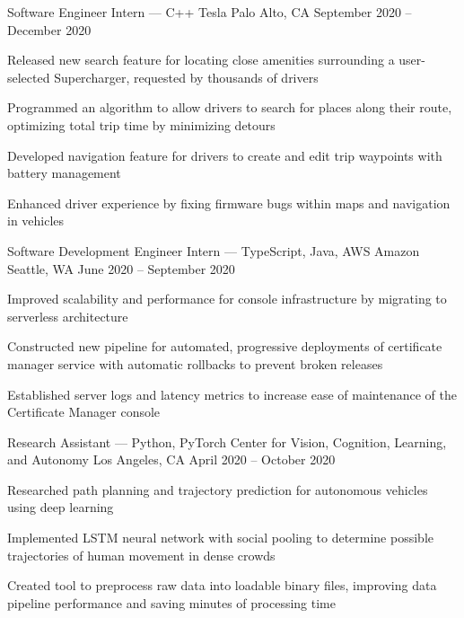 \documentclass[12pt, letterpaper]{awesome-cv}
\begin{document}
\begin{cventries}
  \cventry
    {Sof\/tware Engineer Intern — C++} %
    {Tesla} %
    {Palo Alto, CA} %
    {September 2020 -- December 2020} %
    {
      \begin{cvitems} %
        \item {Released new search feature for locating close amenities surrounding a user-selected Supercharger, requested by thousands of drivers}
        \item {Programmed an algorithm to allow drivers to search for places along their route, optimizing total trip time by minimizing detours}
        \item {Developed navigation feature for drivers to create and edit trip waypoints with battery management}
        \item {Enhanced driver experience by fixing firmware bugs within maps and navigation in vehicles}
      \end{cvitems}
    }

  \cventry
    {Sof\/tware Development Engineer Intern — TypeScript, Java, AWS} %
    {Amazon} %
    {Seattle, WA} %
    {June 2020 -- September 2020} %
    {
      \begin{cvitems} %
        \item {Improved scalability and performance for console infrastructure by migrating to serverless architecture} 
        \item {Constructed new pipeline for automated, progressive deployments of certificate manager service with automatic rollbacks to prevent broken releases}
        \item {Established server logs and latency metrics to increase ease of maintenance of the Certificate Manager console}
      \end{cvitems}
    }

  \cventry
    {Research Assistant — Python, PyTorch} %
    {Center for Vision, Cognition, Learning, and Autonomy} %
    {Los Angeles, CA} %
    {April 2020 -- October 2020} %
    {
      \begin{cvitems} %
        \item {Researched path planning and trajectory prediction for autonomous vehicles using deep learning}
        \item {Implemented LSTM neural network with social pooling to determine possible trajectories of human movement in dense crowds}
        \item {Created tool to preprocess raw data into loadable binary files, improving data pipeline performance and saving minutes of processing time}
      \end{cvitems}
    }


\end{cventries}
\end{document}
